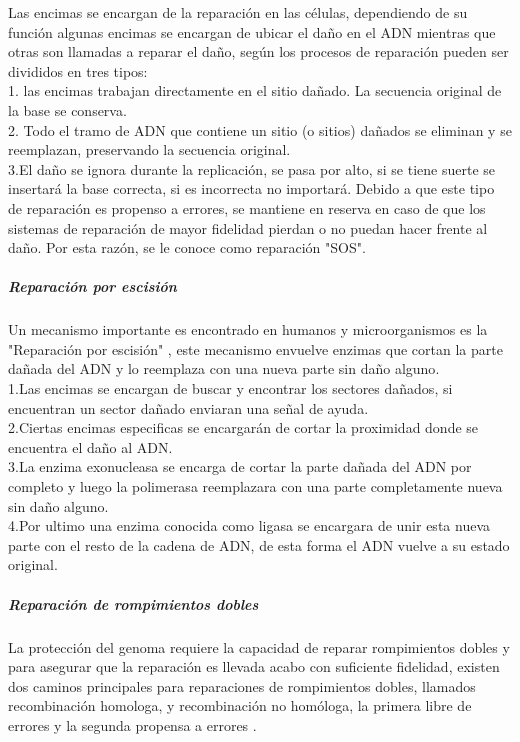 Las encimas se encargan de la reparación en las células, dependiendo de su función algunas encimas se encargan de ubicar el daño en el ADN mientras que otras son llamadas a reparar el daño, según \cite{Thormod} los procesos de reparación pueden ser divididos en tres tipos:\\

1. las encimas trabajan directamente en el sitio dañado. La secuencia original de la base se conserva.\\

2. Todo el tramo de ADN que contiene un sitio (o sitios) dañados se eliminan y se reemplazan, preservando la secuencia original.\\

3.El daño se ignora durante la replicación, se pasa por alto, si se tiene suerte se insertará la base correcta, si es incorrecta no importará. Debido a que este tipo de reparación es propenso a errores, se mantiene en reserva en caso de que los sistemas de reparación de mayor fidelidad pierdan o no puedan hacer frente al daño. Por esta razón, se le conoce como reparación "SOS".\\

\subparagraph{Reparación por escisión}
Un mecanismo importante es encontrado en humanos y microorganismos es la "Reparación por escisión" , este mecanismo envuelve enzimas que cortan la parte dañada del ADN y lo reemplaza con una nueva parte sin daño alguno\cite{Thormod}.\\

1.Las encimas se encargan de buscar y encontrar los sectores dañados, si encuentran un sector dañado enviaran una señal de ayuda.\\

2.Ciertas encimas especificas se encargarán de cortar la proximidad donde se encuentra el daño al ADN.\\

3.La enzima exonucleasa se encarga de cortar la parte dañada del ADN por completo y luego la polimerasa reemplazara con una parte completamente nueva sin daño alguno.\\

4.Por ultimo una enzima conocida como ligasa se encargara de unir esta nueva parte con el resto de la cadena de ADN, de esta forma el ADN vuelve a su estado original.

\subparagraph{Reparación de rompimientos dobles}

La protección del genoma requiere la capacidad de reparar rompimientos dobles y para asegurar que la reparación es llevada acabo con suficiente fidelidad, existen dos caminos principales para reparaciones de rompimientos dobles, llamados recombinación homologa, y recombinación no homóloga, la primera libre de errores y la segunda propensa a errores \cite{rescells}.

